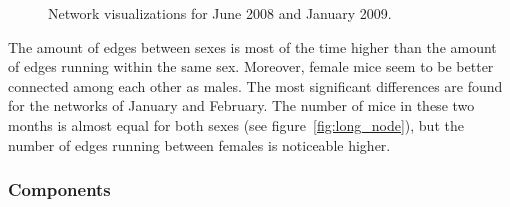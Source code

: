 \begin{figure}[htpb]%
	\centering 
	
	\qquad 			
	\caption[Network visualizations for June 2008 and January 2009]{Network visualizations for June 2008 and January 2009.}
	 \label{fig:june_jan_side}
\end{figure} 

The amount of edges between sexes is most of the time higher than the amount of edges running within the same sex. Moreover, female mice seem to be better connected among each other as males. The most significant differences are found for the networks of January and February. The number of mice in these two months is almost equal for both sexes (see figure~\ref{fig:long_node}), but the number of edges running between females is noticeable higher. 
      
\subsubsection{Components}


